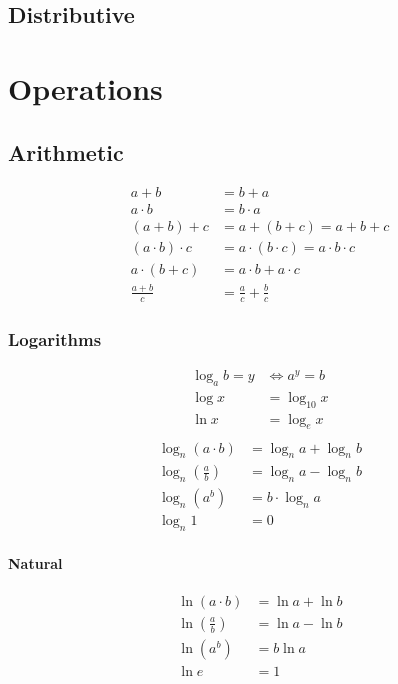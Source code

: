 \documentclass{report}
\theoremstyle{mytheoremstyle}
\theoremstyle{mytheoremstyle}
\theoremstyle{myproblemstyle}
\begin{document}
    \section{Distributive}


    \chapter{Operations}

    \section{Arithmetic}
    \begin{align}
        a + b &= b + a \label{eq:commut-add} \\
        a \cdot b &= b \cdot a \label{eq:commut-mult} \\
        (a + b) + c &= a + (b + c) = a + b + c \label{eq:assoc-add} \\
        (a \cdot b) \cdot c &= a \cdot (b \cdot c) = a \cdot b \cdot c \label{eq:assoc-mul} \\
        a \cdot (b + c) &= a \cdot b + a \cdot c \label{distrib-mul} \\
        \frac{a + b}{c} &= \frac{a}{c} + \frac{b}{c} \label{distrib-div}
    \end{align}

    \subsection{Logarithms}
    \begin{align*}
        \log_a b = y &\iff a^y = b \\
        \log x &= \log_{10} x \\
        \ln x &= \log_{e} x \\
    \end{align*}
    \begin{align}
        \log_n\left( a \cdot b \right) &= \log_n a + \log_n b \\
        \log_n\left( \frac{a}{b} \right) &= \log_n a - \log_n b \\
        \log_n\left( a^b \right) &= b \cdot \log_n a\\
        \log_n 1 &= 0
    \end{align}

    \subsubsection{Natural}
    \begin{align}
        \ln\left( a \cdot b \right) &= \ln a + \ln b \\
        \ln\left( \frac{a}{b} \right) &= \ln a - \ln b \\
        \ln\left( a^b \right) &= b\ln a \\
        \ln e &= 1
    \end{align}
\end{document}
